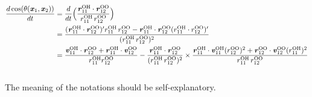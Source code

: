 \documentclass[unsortedaddress,a4paper,onecolumn]{revtex4}
\newcommand{\vect}[1]{\textbf{\textit{#1}}}
\newcommand{\oxy}[0]{{\textrm{O}}}
\newcommand{\hyd}[0]{{\textrm{H}}}
\begin{document}
\begin{align}\nonumber
  \frac{d \cos(\theta(\vect x_1, \vect x_2))}{dt}
  &=
  \frac{d}{dt}
  \Big (
  \frac{\vect r_{11}^{\oxy\hyd}\cdot \vect r_{12}^{\oxy\oxy}}{r_{11}^{\oxy\hyd} \, r_{12}^{\oxy\oxy}}
  \Big ) \\\nonumber
  &=
  \frac{(\vect r_{11}^{\oxy\hyd}\cdot \vect r_{12}^{\oxy\oxy})'r_{11}^{\oxy\hyd}\, r_{12}^{\oxy\oxy} - \vect r_{11}^{\oxy\hyd}\cdot \vect r_{12}^{\oxy\oxy} (r_{11}^{\oxy\hyd}\cdot r_{12}^{\oxy\oxy})'}{ ( r_{11}^{\oxy\hyd}\, r_{12}^{\oxy\oxy} )^2} \\\nonumber
  & =
  \frac{\vect v_{11}^{\oxy\hyd}\cdot \vect r_{12}^{\oxy\oxy}  + \vect r_{11}^{\oxy\hyd}\cdot \vect v_{12}^{\oxy\oxy}}{ r_{11}^{\oxy\hyd}r_{12}^{\oxy\oxy}}
  -
  \frac{\vect r_{11}^{\oxy\hyd}\cdot \vect r_{12}^{\oxy\oxy} } { ( r_{11}^{\oxy\hyd}\, r_{12}^{\oxy\oxy} )^2 } \times
  \frac{ \vect r_{11}^{\oxy\hyd}\cdot \vect v_{11}^{\oxy\hyd} (r_{12}^{\oxy\oxy})^2 + \vect r_{12}^{\oxy\oxy}\cdot \vect v_{12}^{\oxy\oxy} (r_{11}^{\oxy\hyd})^2  }{ r_{11}^{\oxy\hyd}\, r_{12}^{\oxy\oxy} }
  \\\nonumber  
\end{align}
The meaning of the notations should be self-explanatory.

{}

\end{document}

